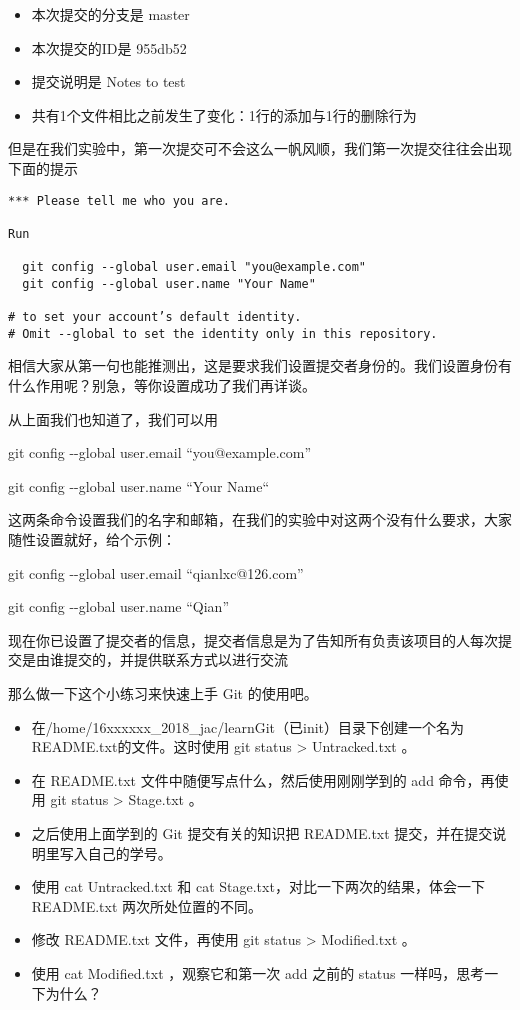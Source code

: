 \begin{itemize}
\item 本次提交的分支\label{分支}是 master
\item 本次提交的ID是 955db52
\item 提交说明是 Notes to test
\item 共有1个文件相比之前发生了变化：1行的添加与1行的删除行为
\end{itemize}

但是在我们实验中，第一次提交可不会这么一帆风顺，我们第一次提交往往会出现 下面的提示
\begin{verbatim}
*** Please tell me who you are.

Run

  git config --global user.email "you@example.com"
  git config --global user.name "Your Name"

# to set your account’s default identity.
# Omit --global to set the identity only in this repository.
\end{verbatim}

相信大家从第一句也能推测出，这是要求我们设置提交者身份的。我们设置身份有 什么作用呢？别急，等你设置成功了我们再详谈。

\begin{note}
从上面我们也知道了，我们可以用

  git config -{}-global user.email “you@example.com”

  git config -{}-global user.name “Your Name“

这两条命令设置我们的名字和邮箱，在我们的实验中对这两个没有什么要求，大家随性设置就好，给个示例：

  git config -{}-global user.email “qianlxc@126.com”

  git config -{}-global user.name “Qian”
\end{note}

现在你已设置了提交者的信息，提交者信息是为了告知所有负责该项目的人每次提交是由谁提交的，并提供联系方式以进行交流

那么做一下这个小练习来快速上手 Git 的使用吧。

\begin{exercise}
\begin{itemize}
    \item 在/home/16xxxxxx\_2018\_jac/learnGit（已init）目录下创建一个名为README.txt的文件。这时使用 git status > Untracked.txt 。
	\item 在 README.txt 文件中随便写点什么，然后使用刚刚学到的 add 命令，再使用 git status > Stage.txt 。
	\item 之后使用上面学到的 Git 提交有关的知识把 README.txt 提交，并在提交说明里写入自己的学号。
	\item 使用 cat Untracked.txt 和 cat Stage.txt，对比一下两次的结果，体会一下README.txt 两次所处位置的不同。
	\item 修改 README.txt 文件，再使用 git status > Modified.txt 。
	\item 使用 cat Modified.txt ，观察它和第一次 add 之前的 status 一样吗，思考一下为什么？
\end{itemize}
\end{exercise}

